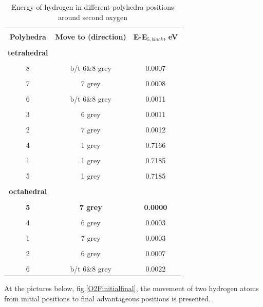 \begin{table}[h]
\scriptsize{
\caption{Energy of hydrogen in different polyhedra positions around second oxygen}
\label{energy2}
\begin{center}
\begin{tabular}{|c|c|c|}
\hline
& & \\
 \textbf{Polyhedra} & \textbf{Move to (direction)} & \textbf{E-E$_{5,black}$, eV}\\ 
\hline
& & \\
 \textbf{tetrahedral}  &  & \\ 
\hline
& & \\
8 & b/t 6\&8 grey & 0.0007 \\
\hline
& & \\
7 & 7 grey & 0.0008 \\
\hline
& & \\
6 & b/t 6\&8 grey & 0.0011 \\
\hline
& & \\
3 & 6 grey & 0.0011 \\
\hline
& &\\
2 & 7 grey & 0.0012 \\
\hline
& & \\
4 & 1 grey & 0.7166 \\
\hline
& &\\
1 & 1 grey & 0.7185 \\
\hline
& &\\
5 & 1 grey & 0.7185 \\
\hline
& &\\
\textbf{octahedral} & & \\
\hline
& & \\
\textbf{5} & \textbf{7 grey} & \textbf{0.0000} \\
\hline
& &  \\
4 & 6 grey & 0.0003 \\
\hline
& & \\
1 & 7 grey & 0.0003 \\
\hline
& & \\
2 & 6 grey & 0.0007 \\
\hline
& & \\
6 & b/t 6\&8 grey & 0.0022 \\
\hline
\end{tabular}
\end{center}
}
\end{table}

At the pictures below, fig.\ref{O2Finitialfinal}, the movement of two hydrogen atoms from initial positions to final advantageous positions is presented. 

